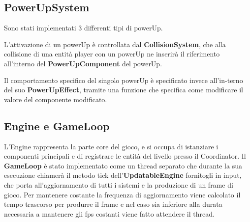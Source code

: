 \subsection{PowerUpSystem}
Sono stati implementati 3 differenti tipi di powerUp.

L'attivazione di un powerUp è controllata dal \textbf{CollisionSystem}, che alla collisione di una entità player con un powerUp ne inserirà il riferimento all'interno del \textbf{PowerUpComponent} del powerUp.

Il comportamento specifico del singolo powerUp è specificato invece all'in-terno del suo \textbf{PowerUpEffect}, tramite una funzione che specifica come modificare il valore del componente modificato.


\subsection{Engine e GameLoop}
L'Engine rappresenta la parte core del gioco, e si occupa di istanziare i componenti principali e di registrare le entità del livello presso il Coordinator.
Il \textbf{GameLoop} è stato implementato come un thread separato che durante la sua esecuzione chiamerà il metodo tick dell'\textbf{UpdatableEngine} fornitogli in input, che porta all'aggiornamento di tutti i sistemi e la produzione di un frame di gioco. Per mantenere costante la frequenza di aggiornamento viene calcolato il tempo trascorso per produrre il frame e nel caso sia inferiore alla durata necessaria a mantenere gli fps costanti viene fatto attendere il thread.
